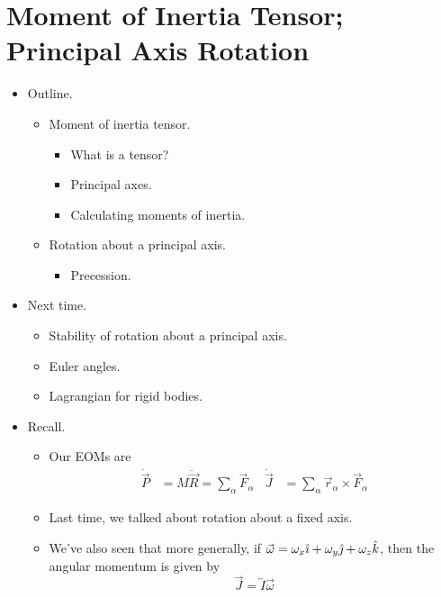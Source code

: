 \documentclass[../notes.tex]{subfiles}
\begin{document}
\section{Moment of Inertia Tensor; Principal Axis Rotation}
\begin{itemize}
    \item {}Outline.
    \begin{itemize}
        \item Moment of inertia tensor.
        \begin{itemize}
            \item What is a tensor?
            \item Principal axes.
            \item Calculating moments of inertia.
        \end{itemize}
        \item Rotation about a principal axis.
        \begin{itemize}
            \item Precession.
        \end{itemize}
    \end{itemize}
    \item Next time.
    \begin{itemize}
        \item Stability of rotation about a principal axis.
        \item Euler angles.
        \item Lagrangian for rigid bodies.
    \end{itemize}
    \item Recall.
    \begin{itemize}
        \item Our EOMs are
        \begin{align*}
            \dot{\vec{P}} &= M\ddot{\vec{R}} = \sum_\alpha\vec{F}_\alpha&
            \dot{\vec{J}} &= \sum_\alpha\vec{r}_\alpha\times\vec{F}_\alpha
        \end{align*}
        \item Last time, we talked about rotation about a fixed axis.
        \item We've also seen that more generally, if $\vec{\omega}=\omega_x\hat{\imath}+\omega_y\hat{\jmath}+\omega_z\hat{k}$, then the angular momentum is given by
        \begin{equation*}
            \vec{J} = \overleftrightarrow{I}\vec{\omega}
        \end{equation*}
    \end{itemize}

\end{itemize}
\end{document}
